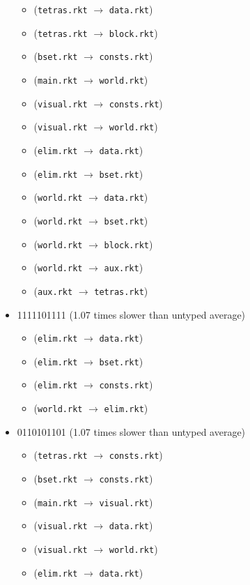 \documentclass{article}
\newcommand{\mono}[1]{\texttt{#1}}
\begin{document}
\begin{itemize}
\begin{itemize}
  \item (\mono{tetras.rkt} $\rightarrow$ \mono{data.rkt})
  \item (\mono{tetras.rkt} $\rightarrow$ \mono{block.rkt})
  \item (\mono{bset.rkt} $\rightarrow$ \mono{consts.rkt})
  \item (\mono{main.rkt} $\rightarrow$ \mono{world.rkt})
  \item (\mono{visual.rkt} $\rightarrow$ \mono{consts.rkt})
  \item (\mono{visual.rkt} $\rightarrow$ \mono{world.rkt})
  \item (\mono{elim.rkt} $\rightarrow$ \mono{data.rkt})
  \item (\mono{elim.rkt} $\rightarrow$ \mono{bset.rkt})
  \item (\mono{world.rkt} $\rightarrow$ \mono{data.rkt})
  \item (\mono{world.rkt} $\rightarrow$ \mono{bset.rkt})
  \item (\mono{world.rkt} $\rightarrow$ \mono{block.rkt})
  \item (\mono{world.rkt} $\rightarrow$ \mono{aux.rkt})
  \item (\mono{aux.rkt} $\rightarrow$ \mono{tetras.rkt})
  \end{itemize}
\item 1111101111 (1.07 times slower than untyped average)
  \begin{itemize}
  \item (\mono{elim.rkt} $\rightarrow$ \mono{data.rkt})
  \item (\mono{elim.rkt} $\rightarrow$ \mono{bset.rkt})
  \item (\mono{elim.rkt} $\rightarrow$ \mono{consts.rkt})
  \item (\mono{world.rkt} $\rightarrow$ \mono{elim.rkt})
  \end{itemize}
\item 0110101101 (1.07 times slower than untyped average)
  \begin{itemize}
  \item (\mono{tetras.rkt} $\rightarrow$ \mono{consts.rkt})
  \item (\mono{bset.rkt} $\rightarrow$ \mono{consts.rkt})
  \item (\mono{main.rkt} $\rightarrow$ \mono{visual.rkt})
  \item (\mono{visual.rkt} $\rightarrow$ \mono{data.rkt})
  \item (\mono{visual.rkt} $\rightarrow$ \mono{world.rkt})
  \item (\mono{elim.rkt} $\rightarrow$ \mono{data.rkt})

\end{itemize}
\end{itemize}
\end{document}
